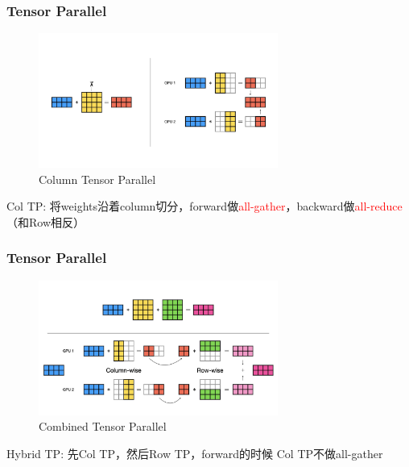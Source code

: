 \documentclass{beamer}
\begin{document}
\begin{frame}[fragile]
\frametitle{Tensor Parallel}

\begin{figure}[h]
    \centering
    \includegraphics[width=0.7\textwidth]{tp-colwise.jpeg}
    \captionsetup{labelformat=empty}
    \caption{Column Tensor Parallel}
\end{figure}

Col TP: 将weights沿着column切分，forward做\textcolor{red}{all-gather}，backward做\textcolor{red}{all-reduce}（和Row相反）\newline

\end{frame}


\begin{frame}[fragile]
\frametitle{Tensor Parallel}

\begin{figure}[h]
    \centering
    \includegraphics[width=0.7\textwidth]{tp-combined.jpeg}
    \captionsetup{labelformat=empty}
    \caption{Combined Tensor Parallel}
\end{figure}
Hybrid TP: 先Col TP，然后Row TP，forward的时候 Col TP不做all-gather

\end{frame}
\end{document}
